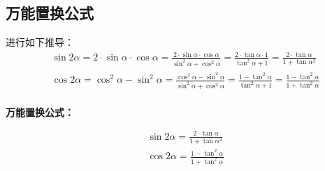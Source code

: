 \documentclass[UTF8]{ctexart}
\begin{document}
\subsection{万能置换公式}
    进行如下推导：
    \begin{align}
        &\sin{2\alpha}
        =2\cdot\sin{\alpha}\cdot\cos{\alpha}
        =\frac{2\cdot\sin{\alpha}\cdot\cos{\alpha}}{\sin^2{\alpha}+\cos^2{\alpha}}
        =\frac{2\cdot\tan{\alpha}\cdot1}{\tan^2{\alpha}+1}
        =\frac{2\cdot\tan{\alpha}}{1+\tan{\alpha^2}}\\[4mm]
        &\cos{2\alpha}
        =\cos^2{\alpha}-\sin^2{\alpha}
        =\frac{\cos^2{\alpha}-\sin^2{\alpha}}{\sin^2{\alpha}+\cos^2{\alpha}}
        =\frac{1-\tan^2{\alpha}}{\tan^2{\alpha}+1}
        =\frac{1-\tan^2{\alpha}}{1+\tan^2{\alpha}}
    \end{align}\\
    \textbf{万能置换公式：}
    \begin{large}
    \begin{align*}
        &\sin{2\alpha}=\frac{2\cdot\tan{\alpha}}{1+\tan{\alpha^2}}\\[4mm]
        &\cos{2\alpha}=\frac{1-\tan^2{\alpha}}{1+\tan^2{\alpha}}
    \end{align*}
    \end{large}

\newpage
\end{document}
